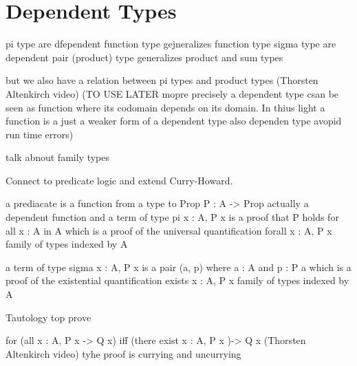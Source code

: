 \section{Dependent Types}
pi type are dfependent function type gejneralizes function type
sigma type are dependent pair (product) type generalizes product and sum types

but we also have a relation between pi types and product types (Thorsten Altenkirch video)
(TO USE LATER mopre precisely a dependent type csan be seen as function where its codomain depends on its domain. 
In thius light a function is a 
 just a weaker form of a dependent type also dependen type avopid run time errors)

talk abnout family types

Connect to predicate logic and extend Curry-Howard.

a prediacate is a function from a type to Prop
P : A -> Prop
actually a dependent function 
and a term of type
pi x : A, P x
is a proof that P holds for all x : A in A
which is a proof of the universal quantification
forall x : A, P x
family of types indexed by A

a term of type
sigma x : A, P x
is a pair (a, p) where a : A and p : P a
which is a proof of the existential quantification
exists x : A, P x
family of types indexed by A  

Tautology top prove 

for (all x : A, P x -> Q x) iff (there exist x : A, P x )-> Q x (Thorsten Altenkirch  video)
tyhe proof is currying and uncurrying
